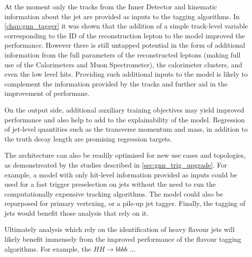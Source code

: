 At the moment only the tracks from the Inner Detector and kinematic information about the jet are provided as inputs to the tagging algorithms.
In \cref{chap:gnn_tagger} it was shown that the addition of a simple track-level variable corresponding to the ID of the reconstruction lepton to the model improved the performance.
However there is still untapped potential in the form of additional information from the full parameters of the reconstructed leptons (making full use of the Calorimeters and Muon Spectrometer), the calorimeter clusters, and even the low level hits.
Providing such additional inputs to the model is likely to complement the information provided by the tracks and further aid in the improvement of performane.

On the output side, additional auxiliary training objectives may yield improved performance and also help to add to the explainability of the model.
Regression of jet-level quantities such as the transverse momentum and mass, in addition to the truth \bhadron decay length are promising regression targets.

The \GNN architecture can also be readily optimised for new use cases and topologies, as demonstreated by the studies described in \cref{sec:gnn_trig_upgrade}.
For example, a model with only hit-level information provided as inputs could be used for a fast trigger preselection on jets without the need to run the computationally expensive tracking algorithms.
The model could also be repurposed for primary vertexing, or a pile-up jet tagger.
Finally, the tagging of \largeR jets would benefit those analysis that rely on it.

Ultimately analysis which rely on the identification of heavy flavour jets will likely benefit immensely from the improved performance of the flavour tagging algorithms.
For example, the $HH \rightarrow bbbb$ ... 
